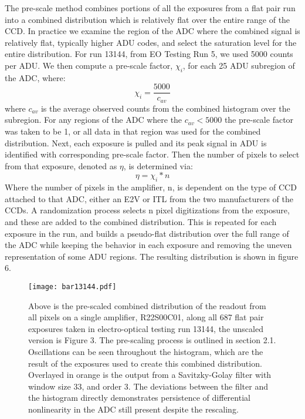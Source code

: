 \documentclass[11pt, letterpaper]{article}
\begin{document}
The pre-scale method combines portions of all the exposures from a flat pair run into a combined distribution which is relatively flat over the entire range of the CCD. 
In practice we examine the region of the ADC where the combined signal is relatively flat, typically higher ADU codes, and select the saturation level for the entire distribution. 
For run 13144, from EO Testing Run 5, we used 5000 counts per ADU. 
 We then compute a pre-scale factor, $\chi _i$, for each 25 ADU subregion of the ADC, where:
\begin{equation}\label{}
\chi_i = \frac{5000}{c_{av}}
\end{equation}
where $c_{av}$ is the average observed counts from the combined histogram over the subregion. 
For any regions of the ADC where the $c_{av} < 5000$ the pre-scale factor was taken to be 1, or all data in that region was used for the combined distribution. 
Next, each exposure is pulled and its peak signal in ADU is identified with corresponding pre-scale factor. 
Then the number of pixels to select from that exposure, denoted as $\eta $, is determined via: 
 \begin{equation}\label{}
 \eta = \chi_i *n 
\end{equation}
Where the number of pixels in the amplifier, n, is dependent on the type of CCD attached to that ADC, either an E2V or ITL from the two manufacturers of the CCDs. 
A randomization process selects n pixel digitizations from the exposure, and these are added to the combined distribution. 
This is repeated for each exposure in the run, and builds a pseudo-flat distribution over the full range of the ADC while keeping the behavior in each exposure and removing the uneven representation of some ADU regions. 
The resulting distribution is shown in figure 6. 


\begin{figure}
	\texttt{[image: bar13144.pdf]}
	\caption{Above is the pre-scaled combined distribution of the readout from all pixels on a single amplifier, R22S00C01, along all 687 flat pair exposures taken in electro-optical testing run 13144, the unscaled version is Figure 3. The pre-scaling process is outlined in section 2.1. Oscillations can be seen throughout the histogram, which are the result of the exposures used to create this combined distribution. Overlayed in orange is the output from a Savitzky-Golay filter with window size 33, and order 3. The deviations between the filter and the histogram directly demonstrates persistence of differential nonlinearity in the ADC still present despite the rescaling.}
\end{figure}
\end{document}
